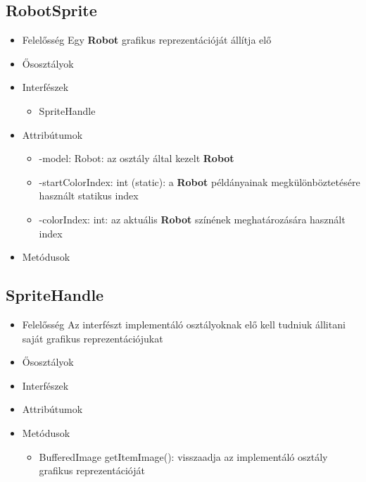 \subsection{RobotSprite}
\begin{itemize}
\item Felelősség \newline
    Egy \textbf{Robot} grafikus reprezentációját állítja elő
\item Ősosztályok
\item Interfészek
    \begin{itemize}
        \item SpriteHandle
    \end{itemize}
\item Attribútumok
    \begin{itemize}
        \item -model: Robot: az osztály által kezelt \textbf{Robot}
        \item -startColorIndex: int (static): a \textbf{Robot} példányainak megkülönböztetésére használt statikus index
        \item -colorIndex: int: az aktuális \textbf{Robot} színének meghatározására használt index
    \end{itemize}
\item Metódusok
\end{itemize}

\subsection{SpriteHandle}
\begin{itemize}
\item Felelősség \newline
    Az interfészt implementáló osztályoknak elő kell tudniuk állitani saját grafikus reprezentációjukat
\item Ősosztályok
\item Interfészek
\item Attribútumok
\item Metódusok
	\begin{itemize}
        \item BufferedImage getItemImage(): visszaadja az implementáló osztály grafikus reprezentációját
	\end{itemize}
\end{itemize}

